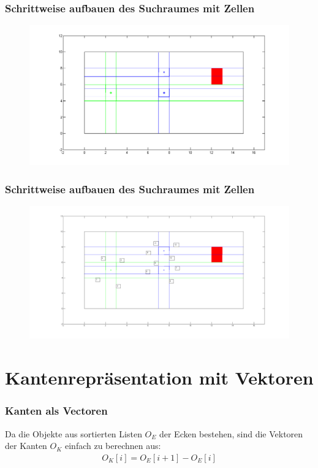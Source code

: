 \documentclass[final]{beamer}
\begin{document}
\begin{frame}
\frametitle{Schrittweise aufbauen des Suchraumes mit Zellen}
\begin{figure}
\centering
\includegraphics[scale=0.3]{../thesis/cellRiddle}
\end{figure}
\end{frame}

\begin{frame}
\frametitle{Schrittweise aufbauen des Suchraumes mit Zellen}
\begin{figure}
\centering
\includegraphics[scale=0.175]{../thesis/cellRiddleNumbered}
\end{figure}
\end{frame}


\section{Kantenrepräsentation mit Vektoren}
\begin{frame}
\frametitle{Kanten als Vectoren}
Da die Objekte aus sortierten Listen $O_{E}$ der Ecken bestehen, sind die Vektoren der Kanten $O_{K}$ einfach zu berechnen aus:
\begin{align*}
O_{K}[i] = O_{E}[i+1] - O_{E}[i] 
\end{align*}
\end{frame}
\end{document}
